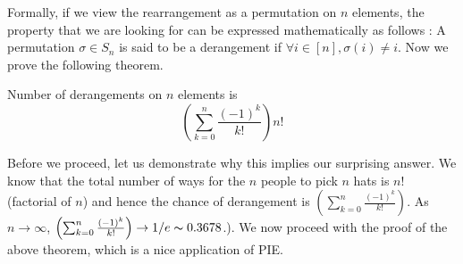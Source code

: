 Formally, if we view the rearrangement as a permutation on $n$ elements, the property that we are looking for can be expressed mathematically as follows : A permutation $\sigma \in S_n$ is said to be a derangement if $\forall i \in [n], \sigma(i) \ne i$.
Now we prove the following theorem.

\begin{theorem}
Number of derangements on $n$ elements is $$\left(\sum_{k=0}^{n} \frac{(-1)^k}{k!}\right)n!$$
\end{theorem}

Before we proceed, let us demonstrate why this implies our surprising answer. We know that the total number of ways for the $n$ people to pick $n$ hats is $n!$ (factorial of $n$) and hence the chance of derangement is $\left(\sum_{k=0}^{n} \frac{(-1)^k}{k!}\right)$. As $n\rightarrow\infty$, $\left(\sum_{k=0}^{n} \frac{(-1)^k}{k!}\right) \rightarrow 1/e \thicksim 0.3678$.). We now proceed with the proof of the above theorem, which is a nice application of PIE.

